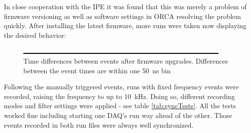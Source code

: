   In close cooperation with the IPE it was found that this was merely a problem of firmware versioning as well as software settings in ORCA resolving the problem quickly. After installing the latest firmware, more runs were taken now displaying the desired behavior:
  \begin{figure}
	\caption[Synchronisation new firmware]{Time differences between events after firmware upgrades. Differences between the event times are within one \SI{50}{\nano\second} bin}
	\includegraphics[width = 0.9 \textwidth]{graphics/dummy.eps}
  \end{figure}
  Following the manually triggered events, runs with fixed frequency events were recorded, raising the frequency to up to \SI{10}{\kilo\hertz}. Doing so, different recording modes and filter settings were applied - see table \ref{tab:syncTests}. All the tests worked fine including starting one DAQ's run way ahead of the other. Those events recorded in both run files were always well synchronized.
